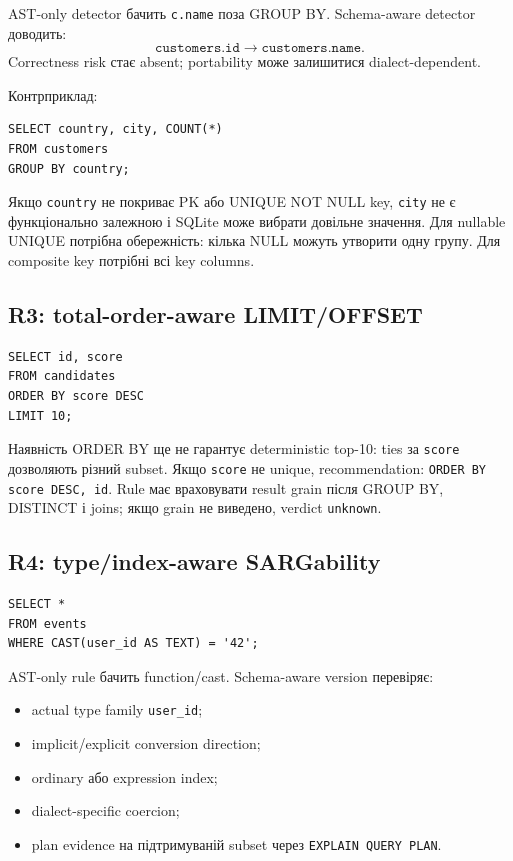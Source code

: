 \documentclass[11pt,a4paper]{article}
\newcommand{\unknown}{\texttt{unknown}}
\begin{document}
AST-only detector бачить \texttt{c.name} поза GROUP BY. Schema-aware detector
доводить:
\[
\texttt{customers.id} \rightarrow \texttt{customers.name}.
\]
Correctness risk стає absent; portability може залишитися dialect-dependent.

Контрприклад:

\begin{lstlisting}[style=sqlstyle]
SELECT country, city, COUNT(*)
FROM customers
GROUP BY country;
\end{lstlisting}

Якщо \texttt{country} не покриває PK або UNIQUE NOT NULL key, \texttt{city} не є
функціонально залежною і SQLite може вибрати довільне значення. Для nullable UNIQUE
потрібна обережність: кілька NULL можуть утворити одну групу. Для composite key
потрібні всі key columns.

\subsection{R3: total-order-aware LIMIT/OFFSET}

\begin{lstlisting}[style=sqlstyle]
SELECT id, score
FROM candidates
ORDER BY score DESC
LIMIT 10;
\end{lstlisting}

Наявність ORDER BY ще не гарантує deterministic top-10: ties за \texttt{score}
дозволяють різний subset. Якщо \texttt{score} не unique, recommendation:
\texttt{ORDER BY score DESC, id}. Rule має враховувати result grain після GROUP BY,
DISTINCT і joins; якщо grain не виведено, verdict \unknown.

\subsection{R4: type/index-aware SARGability}

\begin{lstlisting}[style=sqlstyle]
SELECT *
FROM events
WHERE CAST(user_id AS TEXT) = '42';
\end{lstlisting}

AST-only rule бачить function/cast. Schema-aware version перевіряє:

\begin{itemize}
\item actual type family \texttt{user\_id};
\item implicit/explicit conversion direction;
\item ordinary або expression index;
\item dialect-specific coercion;
\item plan evidence на підтримуваній subset через \texttt{EXPLAIN QUERY PLAN}.
\end{itemize}
\end{document}

